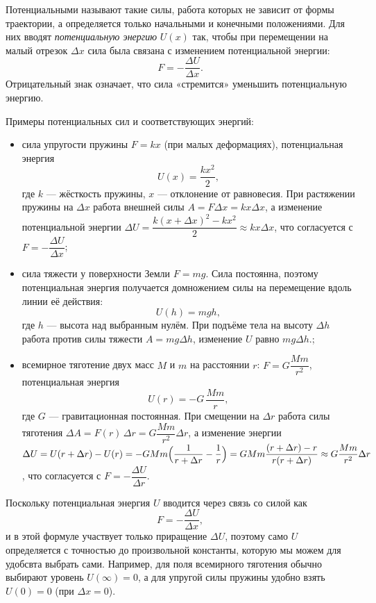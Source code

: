 \documentclass[12pt, a4paper]{article}%
\begin{document}
Потенциальными называют такие силы, работа которых не зависит от формы траектории, а определяется только начальными и конечными положениями. Для них вводят \textit{потенциальную энергию} $U(x)$ так, чтобы при перемещении на малый отрезок $\Delta x$ сила была связана с изменением потенциальной энергии:
\[
F = -\frac{\Delta U}{\Delta x}.
\]
Отрицательный знак означает, что сила «стремится» уменьшить потенциальную энергию.

Примеры потенциальных сил и соответствующих энергий:
\begin{itemize}
  \item сила упругости пружины $F = k x$ (при малых деформациях), потенциальная энергия
  \[
    U(x) = \frac{k x^2}{2},
  \]
  где $k$ — жёсткость пружины, $x$ — отклонение от равновесия. При растяжении пружины на $\Delta x$ работа 
  внешней силы $A = F\Delta x = kx\Delta x$, а изменение потенциальной энергии $\Delta U = \dfrac{k(x+\Delta x)^2 - kx^2}{2} \approx kx\Delta x$, что согласуется с $F=-\dfrac{\Delta U}{\Delta x}$;
  \item сила тяжести у поверхности Земли $F = m g$. Сила постоянна, поэтому потенциальная энергия получается домножением силы на перемещение вдоль линии её действия:
  \[
    U(h) = m g h,
  \]
  где $h$ — высота над выбранным нулём. При подъёме тела на высоту $\Delta h$ работа против силы тяжести $A = mg\Delta h$, изменение $U$ равно $mg\Delta h$.;
  \item всемирное тяготение двух масс $M$ и $m$ на расстоянии $r$: $F = G\dfrac{M m}{r^2}$, потенциальная энергия
  \[
    U(r) = -G\,\frac{M m}{r},
  \]
  где $G$ — гравитационная постоянная. При смещении на $\Delta r$ работа силы тяготения $\Delta A = F(r)\,\Delta r = G\dfrac{M m}{r^2}\Delta r$, 
  а изменение энергии $\Delta U = U(r+\Delta r)-U(r) = -G M m\Bigl(\dfrac1{r+\Delta r}-\dfrac1r\Bigr) = GMm\dfrac{(r+\Delta r) - r}{r(r+\Delta r)}\approx G\dfrac{M m}{r^2}\Delta r$, что согласуется с $F=-\dfrac{\Delta U}{\Delta r}$.

\end{itemize}

Поскольку потенциальная энергия $U$ вводится через связь со силой как
\[
F = -\frac{\Delta U}{\Delta x},
\]
и в этой формуле участвует только приращение $\Delta U$, поэтому само $U$ определяется с точностью до произвольной константы, которую мы можем для удобсвта выбрать сами. Например, для поля всемирного тяготения обычно выбирают уровень $U(\infty)=0$, а для упругой силы пружины удобно взять $U(0)=0$ (при $\Delta x=0$).
\end{document}

